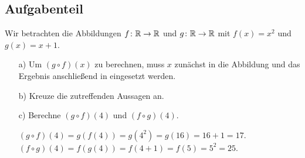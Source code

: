 \documentclass[]{uebungsblatt}
\begin{document}

\subsection*{Aufgabenteil}
\begin{exercise}
    Wir betrachten die Abbildungen $f\colon\mathbb{R}\rightarrow\mathbb{R}$ und $g\colon\mathbb{R}\rightarrow\mathbb{R}$ mit $f(x)=x^2$ und $g(x)=x+1$.
    \begin{enumerate}
        \item[a)] Um $(g\circ f)(x)$ zu berechnen, muss $x$ zunächst in die Abbildung  und das Ergebnis anschließend in  eingesetzt werden.
        \item[b)] Kreuze die zutreffenden Aussagen an.
        \item[c)] Berechne $(g\circ f)(4)$ und $(f\circ g)(4)$.
        \begin{answerbox}[.5in]
            $(g\circ f)(4)=g(f(4))=g(4^2)=g(16)=16+1=17$.\\
            $(f\circ g)(4)=f(g(4))=f(4+1)=f(5)=5^2=25$.
        \end{answerbox}
    \end{enumerate}
\end{exercise}

\end{document}
